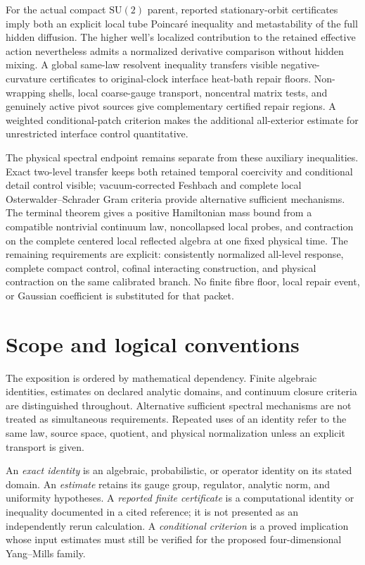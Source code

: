 \documentclass[11pt,oneside,openany]{book}
\theoremstyle{definition}
\theoremstyle{remark}
\newcommand{\SU}{\mathrm{SU}}
\begin{document}
For the actual compact $\SU(2)$ parent, reported stationary-orbit
certificates imply both an explicit local tube Poincar\'e inequality
and metastability of the full hidden diffusion. The higher well's
localized contribution to the retained effective action nevertheless
admits a normalized derivative comparison without hidden mixing. A
global same-law resolvent inequality transfers visible negative-curvature
certificates to original-clock interface heat-bath repair floors.
Non-wrapping shells, local coarse-gauge transport, noncentral matrix
tests, and genuinely active pivot sources give complementary certified
repair regions. A weighted conditional-patch criterion makes the
additional all-exterior estimate for unrestricted interface control
quantitative.

The physical spectral endpoint remains separate from these auxiliary
inequalities. Exact two-level transfer keeps both retained temporal
coercivity and conditional detail control visible; vacuum-corrected
Feshbach and complete local Osterwalder--Schrader Gram criteria provide
alternative sufficient mechanisms. The terminal theorem gives a positive
Hamiltonian mass bound from a compatible nontrivial continuum law,
noncollapsed local probes, and contraction on the complete centered
local reflected algebra at one fixed physical time. The remaining
requirements are explicit: consistently normalized all-level response,
complete compact control, cofinal interacting construction, and physical
contraction on the same calibrated branch. No finite fibre floor, local
repair event, or Gaussian coefficient is substituted for that packet.

\chapter*{Scope and logical conventions}
The exposition is ordered by mathematical dependency. Finite algebraic
identities, estimates on declared analytic domains, and continuum closure
criteria are distinguished throughout. Alternative sufficient spectral
mechanisms are not treated as simultaneous requirements. Repeated uses of
an identity refer to the same law, source space, quotient, and physical
normalization unless an explicit transport is given.

An \emph{exact identity} is an algebraic, probabilistic, or operator
identity on its stated domain. An \emph{estimate} retains its gauge group,
regulator, analytic norm, and uniformity hypotheses. A \emph{reported
finite certificate} is a computational identity or inequality documented
in a cited reference; it is not presented as an independently rerun
calculation. A \emph{conditional criterion} is a proved implication whose
input estimates must still be verified for the proposed four-dimensional
Yang--Mills family.
\end{document}
